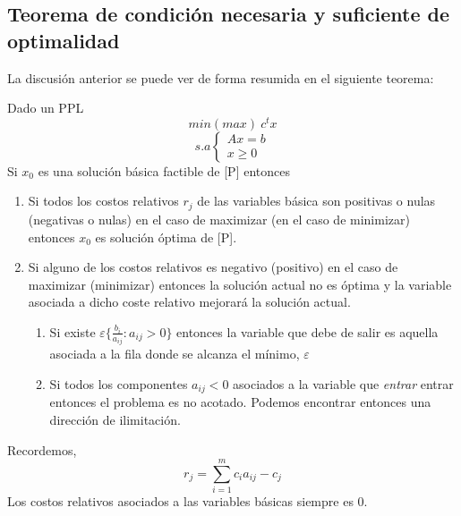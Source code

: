 \subsection{Teorema de condición necesaria y suficiente de
  optimalidad}

La discusión anterior se puede ver de forma resumida en el siguiente
teorema:
\begin{teorema}
  Dado un PPL 
  $$min (max) ~ c^t x $$
  $$s.a \left\{
    \begin{array}{c}
      Ax=b \\
      x\geq 0
    \end{array}
  \right.$$
  Si $x_0$ es una solución básica factible de [P] entonces
  \begin{enumerate}
    \item Si todos los costos relativos $r_j$ de las variables básica son positivas o nulas (negativas o nulas) en el caso de maximizar (en el caso de minimizar) entonces $x_0$ es solución óptima de [P].
    \item Si alguno de los costos relativos es negativo (positivo) en el caso de maximizar (minimizar) entonces la solución actual no es óptima y la variable asociada a dicho coste relativo mejorará la solución actual.
    \begin{enumerate}
      \item Si existe $\varepsilon\{\frac{b_i}{a_{ij}} : a_{ij} >0 \}$ entonces la variable que debe de salir es aquella asociada a la fila donde se alcanza el mínimo, $\varepsilon$
      \item Si todos los componentes $a_{ij}<0$ asociados a la variable que \textit{entrar} entrar entonces el problema es no acotado. Podemos encontrar entonces una dirección de ilimitación.
    \end{enumerate}
  \end{enumerate}
  Recordemos, $$r_j=\sum_{i=1}^{m}c_i a_{ij}-c_j$$ 
  Los costos relativos asociados a las variables básicas siempre es $0$.
\end{teorema}

